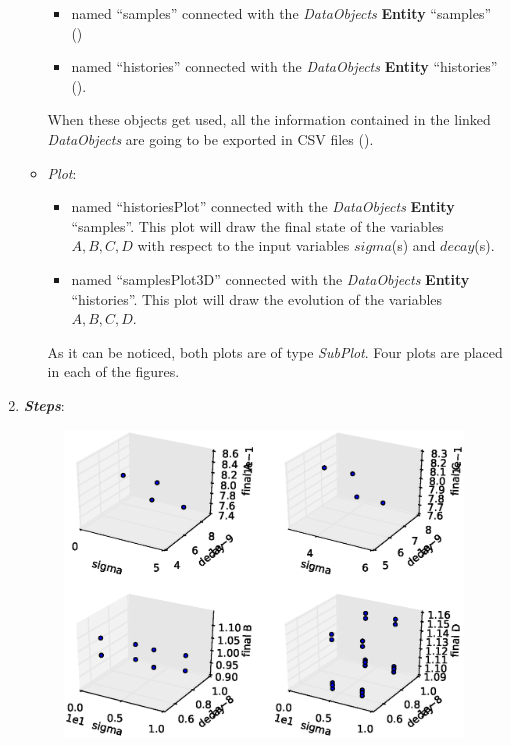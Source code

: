 \begin{enumerate}
\begin{itemize}
     \begin{itemize}
       \item named ``samples'' connected with the \textit{DataObjects} \textbf{Entity} ``samples''
                ()
       \item named ``histories'' connected with the \textit{DataObjects} \textbf{Entity} ``histories'' ().
     \end{itemize}
      When these objects get used, all the information contained in the
      linked  \textit{DataObjects} are going
    to be exported in CSV files ().
    \item \textit{Plot}:
    \begin{itemize}
      \item named ``historiesPlot'' connected with the  \textit{DataObjects}
      \textbf{Entity} ``samples''.  This plot will draw the final state of the
      variables $A,B,C,D$ with respect to the input variables $sigma$(s)
      and $decay$(s).
      \item named ``samplesPlot3D'' connected with the
      \textit{DataObjects} \textbf{Entity} ``histories''. This plot will draw the
      evolution of the variables $A,B,C,D$.
    \end{itemize}
     As it can be noticed, both plots are of type \textit{SubPlot}. Four plots
     are placed in each of the figures.
  \end{itemize}
   \item \textbf{\textit{Steps}}:
 \begin{figure}[h!]
  \centering
  \includegraphics[scale=0.7]{../../tests/framework/user_guide/ForwardSamplingStrategies/gold/RunDir/Grid/1-samplesPlot3D_scatter-scatter-scatter-scatter.eps}

\end{figure}
\end{enumerate}
